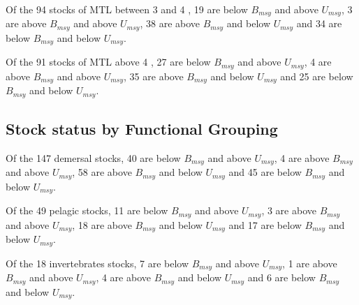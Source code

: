 Of the 94 stocks of MTL between 3 and 4 , 19 are below $B_{msy}$ and above $U_{msy}$, 3 are above $B_{msy}$ and above $U_{msy}$, 38 are above $B_{msy}$ and below $U_{msy}$ and 34 are below $B_{msy}$ and below $U_{msy}$.

Of the 91 stocks of MTL above 4 , 27 are below $B_{msy}$ and above $U_{msy}$, 4 are above $B_{msy}$ and above $U_{msy}$, 35 are above $B_{msy}$ and below $U_{msy}$ and 25 are below $B_{msy}$ and below $U_{msy}$.

\subsection*{Stock status by Functional Grouping}
Of the 147 demersal stocks, 40 are below $B_{msy}$ and above $U_{msy}$, 4 are above $B_{msy}$ and above $U_{msy}$, 58 are above $B_{msy}$ and below $U_{msy}$ and 45 are below $B_{msy}$ and below $U_{msy}$.

Of the 49 pelagic stocks, 11 are below $B_{msy}$ and above $U_{msy}$, 3 are above $B_{msy}$ and above $U_{msy}$, 18 are above $B_{msy}$ and below $U_{msy}$ and 17 are below $B_{msy}$ and below $U_{msy}$.

Of the 18 invertebrates stocks, 7 are below $B_{msy}$ and above $U_{msy}$, 1 are above $B_{msy}$ and above $U_{msy}$, 4 are above $B_{msy}$ and below $U_{msy}$ and 6 are below $B_{msy}$ and below $U_{msy}$.
